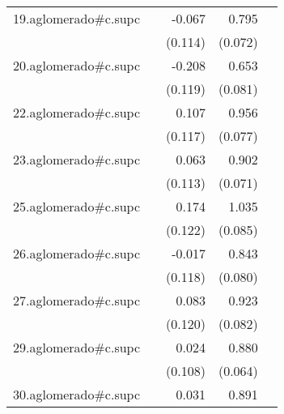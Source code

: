 {\begin{longtable}{l*{4}{D{.}{.}{-1}}}
\addlinespace
19.aglomerado#c.supc&                     &      -0.067         &       0.795\sym{***}&                     \\
            &                     &     (0.114)         &     (0.072)         &                     \\
\addlinespace
20.aglomerado#c.supc&                     &      -0.208         &       0.653\sym{***}&                     \\
            &                     &     (0.119)         &     (0.081)         &                     \\
\addlinespace
22.aglomerado#c.supc&                     &       0.107         &       0.956\sym{***}&                     \\
            &                     &     (0.117)         &     (0.077)         &                     \\
\addlinespace
23.aglomerado#c.supc&                     &       0.063         &       0.902\sym{***}&                     \\
            &                     &     (0.113)         &     (0.071)         &                     \\
\addlinespace
25.aglomerado#c.supc&                     &       0.174         &       1.035\sym{***}&                     \\
            &                     &     (0.122)         &     (0.085)         &                     \\
\addlinespace
26.aglomerado#c.supc&                     &      -0.017         &       0.843\sym{***}&                     \\
            &                     &     (0.118)         &     (0.080)         &                     \\
\addlinespace
27.aglomerado#c.supc&                     &       0.083         &       0.923\sym{***}&                     \\
            &                     &     (0.120)         &     (0.082)         &                     \\
\addlinespace
29.aglomerado#c.supc&                     &       0.024         &       0.880\sym{***}&                     \\
            &                     &     (0.108)         &     (0.064)         &                     \\
\addlinespace
30.aglomerado#c.supc&                     &       0.031         &       0.891\sym{***}&                     \\

\end{longtable}}
